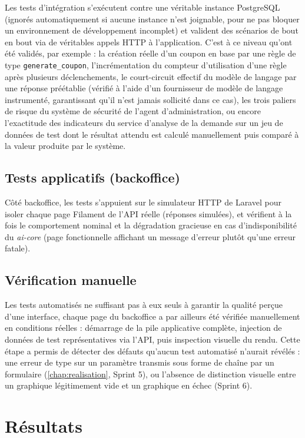 Les tests d'intégration s'exécutent contre une véritable instance PostgreSQL (ignorés automatiquement si aucune instance n'est joignable, pour ne pas bloquer un environnement de développement incomplet) et valident des scénarios de bout en bout via de véritables appels HTTP à l'application. C'est à ce niveau qu'ont été validés, par exemple : la création réelle d'un coupon en base par une règle de type \texttt{generate\_coupon}, l'incrémentation du compteur d'utilisation d'une règle après plusieurs déclenchements, le court-circuit effectif du modèle de langage par une réponse préétablie (vérifié à l'aide d'un fournisseur de modèle de langage instrumenté, garantissant qu'il n'est jamais sollicité dans ce cas), les trois paliers de risque du système de sécurité de l'agent d'administration, ou encore l'exactitude des indicateurs du service d'analyse de la demande sur un jeu de données de test dont le résultat attendu est calculé manuellement puis comparé à la valeur produite par le système.

\subsection{Tests applicatifs (backoffice)}

Côté backoffice, les tests s'appuient sur le simulateur HTTP de Laravel pour isoler chaque page Filament de l'API réelle (réponses simulées), et vérifient à la fois le comportement nominal et la dégradation gracieuse en cas d'indisponibilité du \emph{ai-core} (page fonctionnelle affichant un message d'erreur plutôt qu'une erreur fatale).

\subsection{Vérification manuelle}

Les tests automatisés ne suffisant pas à eux seuls à garantir la qualité perçue d'une interface, chaque page du backoffice a par ailleurs été vérifiée manuellement en conditions réelles : démarrage de la pile applicative complète, injection de données de test représentatives via l'API, puis inspection visuelle du rendu. Cette étape a permis de détecter des défauts qu'aucun test automatisé n'aurait révélés : une erreur de type sur un paramètre transmis sous forme de chaîne par un formulaire (\cref{chap:realisation}, Sprint 5), ou l'absence de distinction visuelle entre un graphique légitimement vide et un graphique en échec (Sprint 6).

\section{Résultats}


